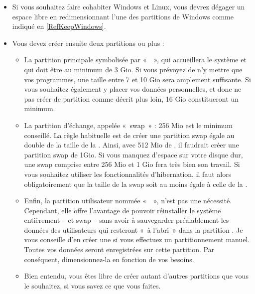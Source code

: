 \begin{itemize}
\item Si vous souhaitez faire cohabiter Windows et Linux, vous devrez dégager un espace libre en redimensionnant l'une des partitions de Windows comme indiqué en \ref{RefKeepWindows}.
\item Vous devez créer ensuite deux partitions ou plus :
\Partitionnement
\begin{itemize}
\item La partition principale symbolisée par «~\Chemin{/}~», qui accueillera le système et qui doit être au minimum de 3 Gio. Si vous prévoyez de n'y mettre que vos programmes, une taille entre 7 et 10 Gio sera amplement suffisante. Si vous souhaitez également y placer vos données personnelles, et donc ne pas créer de partition  comme décrit plus loin, 16 Gio constitueront un minimum.
\item La partition d'échange, appelée «~swap~» : 256 Mio est le minimum conseillé. La règle habituelle est de créer une partition swap égale au double de la taille de la . Ainsi, avec 512 Mio de , il faudrait créer une partition swap de 1Gio. Si vous manquez d'espace sur votre disque dur, une swap comprise entre 256 Mio et 1 Gio fera très bien son travail. Si vous souhaitez utiliser les fonctionnalités d'hibernation, il faut alors obligatoirement que la taille de la swap soit au moins égale à celle de la .
\item Enfin, la partition utilisateur nommée «~~», n'est pas une nécessité. Cependant, elle offre l'avantage de pouvoir réinstaller le système entièrement -- \Chemin{/} et swap -- sans avoir à sauvegarder préalablement les données des utilisateurs qui resteront «~à l'abri~» dans la partition . Je vous conseille d'en créer une si vous effectuez un partitionnement manuel. Toutes vos données seront enregistrées sur cette partition. Par conséquent, dimensionnez-la en fonction de vos besoins.
\item Bien entendu, vous êtes libre de créer autant d'autres partitions que vous le souhaitez, si vous savez ce que vous faites.
\end{itemize}

\end{itemize}
